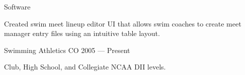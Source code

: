 \begin{cventries}
  \cventry
    {Software}
    {} %
    {} %
    {} %
    {
      \begin{cvitems} %
        \item {Created swim meet lineup editor UI that allows swim coaches to create meet manager entry files using an intuitive table layout.}
        \end{cvitems}
   }

 \cventry
    {Swimming} %
    {Athletics} %
    {CO} %
    {2005 --- Present} %
    {
      \begin{cvitems} %
        \item {Club, High School, and Collegiate NCAA DII levels.}
      \end{cvitems}
   }

\end{cventries}
